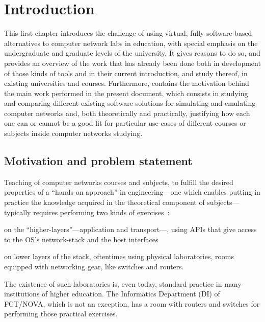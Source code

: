 
\chapter{Introduction}
\label{ch:introduction}

This first chapter introduces the challenge of using virtual, fully software-based alternatives to computer network labs in education, with special emphasis on the undergraduate and graduate levels of the university. %
It gives reasons to do so, and provides an overview of the work that has already been done both in development of those kinds of tools and in their current introduction, and study thereof, in existing universities and courses.
Furthermore, contains the motivation behind the main work performed in the present document, which consists in studying and comparing different existing software solutions for simulating and emulating computer networks and, both theoretically and practically, justifying how each one can or cannot be a good fit for particular use-cases of different courses or subjects inside computer networks studying.

\section{Motivation and problem statement}
\label{sec:motivation}

Teaching of computer networks courses and subjects, to fulfill the desired properties of a ``hands-on approach'' in engineering---one which enables putting in practice the knowledge acquired in the theoretical component of subjects---typically requires performing two kinds of exercises~\cite{problembasedlearning}: %
  \begin{enumerate*}[label=(\roman*), itemjoin={{, }}, itemjoin*={{, and }}]
  \item on the ``higher-layers''---application and transport---, using APIs that give access to the OS's network-stack and the host interfaces
  \item on lower layers of the stack, oftentimes using physical laboratories, rooms equipped with networking gear, like switches and routers.
  \end{enumerate*}
The existence of such laboratories is, even today, standard practice in many institutions of higher education.
The Informatics Department (DI) of FCT/NOVA, which is not an exception, has a room with routers and switches for performing those practical exercises.

